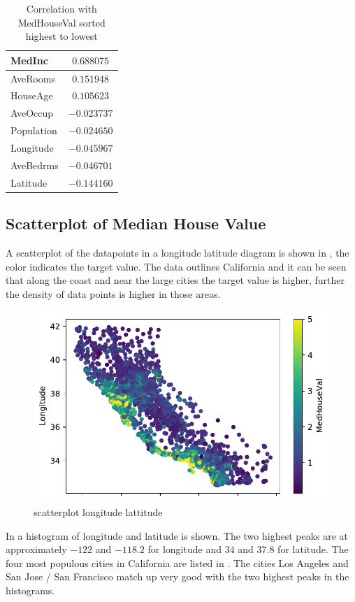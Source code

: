 \documentclass[12pt,a4paper]{scrartcl}
\begin{document}
	\begin{table}[H]
		\centering
		\begin{tabular}{|l|c|}
			\hline
			MedInc     & $\num{0.688075}$  \\ \hline
			AveRooms   & $\num{0.151948}$  \\ \hline
			HouseAge   & $\num{0.105623}$  \\ \hline
			AveOccup   & $\num{-0.023737}$ \\ \hline
			Population & $\num{-0.024650}$ \\ \hline
			Longitude  & $\num{-0.045967}$ \\ \hline
			AveBedrms  & $\num{-0.046701}$ \\ \hline
			Latitude   & $\num{-0.144160}$ \\ \hline
		\end{tabular}
		\caption{Correlation with MedHouseVal sorted highest to lowest}
		\label{tab:ex1_3_corr}
	\end{table}

	
	
	\subsection*{Scatterplot of Median House Value}
	
	A scatterplot of the datapoints in a longitude latitude diagram is shown in , the color indicates the target value.
	The data outlines California and it can be seen that along the coast and near the large cities the target value is higher, further the density of data points is higher in those areas.
	
	\begin{figure}[H]
		\centering	\includegraphics[width=0.5\linewidth]{figs/ex1_3_lon_lat.pdf}
		\caption{scatterplot longitude lattitude}
		\label{fig:ex1_3_scatter_lon_lat}
	\end{figure}
	
	
	In  a histogram of longitude and latitude is shown.
	The two highest peaks are at approximately $-122$ and $-118.2$ for longitude and $34$ and $37.8$ for latitude.
	The four most populous cities in California are listed in . The cities Los Angeles and San Jose / San Francisco match up very good with the two highest peaks in the histograms.
	
\end{document}
